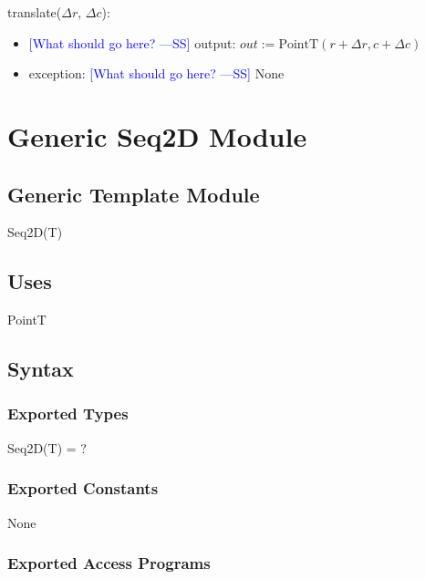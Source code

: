 \documentclass[12pt]{article}
\newcommand{\authornote}[3]{\textcolor{#1}{[#3 ---#2]}}
\newcommand{\authornote}[3]{}
\newcommand{\wss}[1]{\authornote{blue}{SS}{#1}}
\begin{document}
\noindent translate($\Delta r$, $\Delta c$):
\begin{itemize}
\item \wss{What should go here?} output: $out := \mbox{PointT}(r + \Delta r, c + \Delta c)$
\item exception: \wss{What should go here?} None
\end{itemize}

\newpage

\section* {Generic Seq2D Module}

\subsection* {Generic Template Module}

Seq2D(T)

\subsection* {Uses}

PointT

\subsection* {Syntax}

\subsubsection* {Exported Types}

Seq2D(T) = ?

\subsubsection* {Exported Constants}

None

\subsubsection* {Exported Access Programs}
\end{document}
